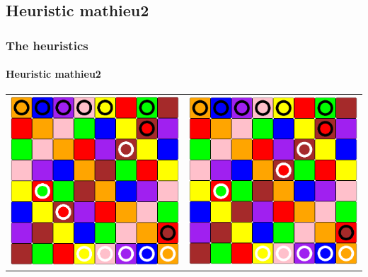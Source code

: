 \documentclass[a4paper, 11pt]{beamer}
\begin{document}
\subsection{Heuristic mathieu2}
\begin{frame}
 \frametitle{The heuristics}
 \framesubtitle{Heuristic mathieu2}
 \begin{table}[htbp]
  \centering
  \begin{tabular}{c c}
    \includegraphics[scale = 0.11]{mathieu2_3.png} & \includegraphics[scale = 0.11]{mathieu2_4.png} \\

\end{tabular}
\end{table}
\end{frame}
\end{document}
